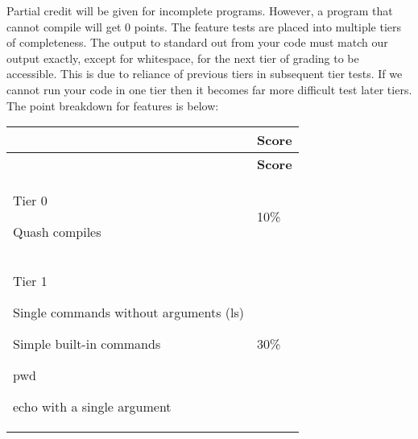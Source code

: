 Partial credit will be given for incomplete programs. However, a program that cannot compile will get 0 points. The feature tests are placed into multiple tiers of completeness. The output to standard out from your code must match our output exactly, except for whitespace, for the next tier of grading to be accessible. This is due to reliance of previous tiers in subsequent tier tests. If we cannot run your code in one tier then it becomes far more difficult test later tiers. The point breakdown for features is below\+:

\tabulinesep=1mm
\begin{longtabu} spread 0pt [c]{*2{|X[-1]}|}
\hline
{}&{\bf Score   }\\
\endfirsthead
\hline
\endfoot
\hline
{}&{\bf Score   }\\
\endhead

\begin{DoxyItemize}
\item Tier 0  
\begin{DoxyItemize}
\item Quash compiles  
\end{DoxyItemize}
\end{DoxyItemize}&10\%   \\

\begin{DoxyItemize}
\item Tier 1  
\begin{DoxyItemize}
\item Single commands without arguments (ls)  
\item Simple built-\/in commands  
\begin{DoxyItemize}
\item pwd  
\item echo with a single argument  
\end{DoxyItemize}
\end{DoxyItemize}
\end{DoxyItemize}&30\%   \\


\end{longtabu}
